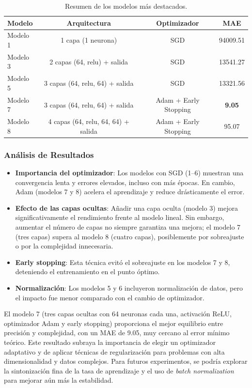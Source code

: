 \documentclass[12pt]{article}
\begin{document}
\begin{table}[htbp]
\centering
\caption{Resumen de los modelos más destacados.}
\label{tab:resumen_modelos}
\begin{tabular}{l c c c}
\toprule
\textbf{Modelo} & \textbf{Arquitectura} & \textbf{Optimizador} & \textbf{MAE} \\
\midrule
Modelo 1 & 1 capa (1 neurona) & SGD & 94009.51 \\
Modelo 3 & 2 capas (64, relu) + salida & SGD & 13541.27 \\
Modelo 5 & 3 capas (64, relu, 64) + salida & SGD & 13321.56 \\
Modelo 7 & 3 capas (64, relu, 64) + salida & Adam + Early Stopping & \textbf{9.05} \\
Modelo 8 & 4 capas (64, relu, 64, 64) + salida & Adam + Early Stopping & 95.07 \\
\bottomrule
\end{tabular}
\end{table}

\subsubsection*{Análisis de Resultados}

\begin{itemize}
    \item \textbf{Importancia del optimizador}: Los modelos con SGD (1--6) muestran una convergencia lenta y errores elevados, incluso con más épocas. En cambio, Adam (modelos 7 y 8) acelera el aprendizaje y reduce drásticamente el error.
    \item \textbf{Efecto de las capas ocultas}: Añadir una capa oculta (modelo 3) mejora significativamente el rendimiento frente al modelo lineal. Sin embargo, aumentar el número de capas no siempre garantiza una mejora; el modelo 7 (tres capas) supera al modelo 8 (cuatro capas), posiblemente por sobreajuste o por la complejidad innecesaria.
    \item \textbf{Early stopping}: Esta técnica evitó el sobreajuste en los modelos 7 y 8, deteniendo el entrenamiento en el punto óptimo.
    \item \textbf{Normalización}: Los modelos 5 y 6 incluyeron normalización de datos, pero el impacto fue menor comparado con el cambio de optimizador.
\end{itemize}

El modelo 7 (tres capas ocultas con 64 neuronas cada una, activación ReLU, optimizador Adam y early stopping) proporciona el mejor equilibrio entre precisión y complejidad, con un MAE de 9.05, muy cercano al error mínimo teórico. Este resultado subraya la importancia de elegir un optimizador adaptativo y de aplicar técnicas de regularización para problemas con alta dimensionalidad y datos complejos. Para futuros experimentos, se podría explorar la sintonización fina de la tasa de aprendizaje y el uso de \textit{batch normalization} para mejorar aún más la estabilidad.
\end{document}
